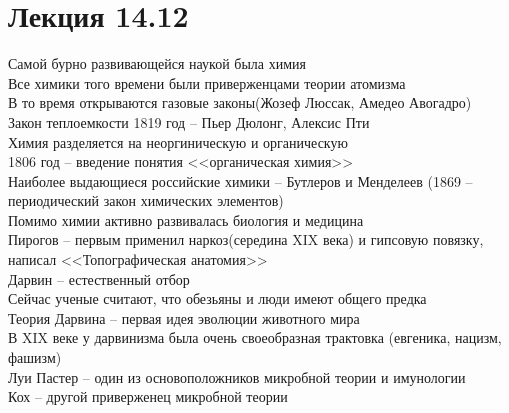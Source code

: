 \documentclass[12pt]{article}
\begin{document}
\section{Лекция 14.12}
Самой бурно развивающейся наукой была химия\\
Все химики того времени были приверженцами теории атомизма\\
В то время открываются газовые законы(Жозеф Люссак, Амедео Авогадро)\\
Закон теплоемкости 1819 год -- Пьер Дюлонг, Алексис Пти\\
Химия разделяется на неоргиническую и органическую\\
1806 год -- введение понятия <<органическая химия>>\\
Наиболее выдающиеся российские химики -- Бутлеров и Менделеев (1869 -- периодический закон химических элементов)\\
Помимо химии активно развивалась биология и медицина\\
Пирогов -- первым применил наркоз(середина XIX века) и гипсовую повязку, написал <<Топографическая анатомия>>\\
Дарвин -- естественный отбор\\
Сейчас ученые считают, что обезьяны и люди имеют общего предка\\
Теория Дарвина -- первая идея эволюции животного мира\\
В XIX веке у дарвинизма была очень своеобразная трактовка (евгеника, нацизм, фашизм)\\
Луи Пастер -- один из основоположников микробной теории и имунологии\\
Кох -- другой приверженец микробной теории\\
\end{document}

